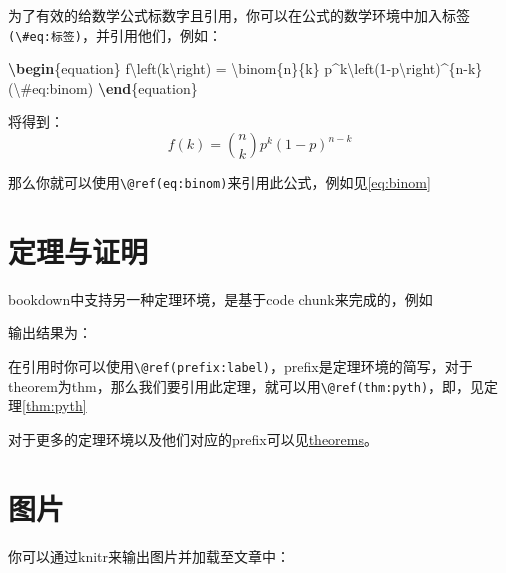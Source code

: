 \documentclass[singlesided]{Style/ucasthesis}%
\newenvironment{Shaded}{\begin{snugshade}}{\end{snugshade}}
\newcommand{\KeywordTok}[1]{\textcolor[rgb]{0.13,0.29,0.53}{\textbf{{#1}}}}
\newcommand{\SpecialCharTok}[1]{\textcolor[rgb]{0.00,0.00,0.00}{{#1}}}
\newcommand{\SpecialStringTok}[1]{\textcolor[rgb]{0.31,0.60,0.02}{{#1}}}
\newcommand{\ExtensionTok}[1]{{#1}}
\newcommand{\NormalTok}[1]{{#1}}
\begin{document}
为了有效的给数学公式标数字且引用，你可以在公式的数学环境中加入标签\texttt{(\textbackslash{}\#eq:标签)}，并引用他们，例如：

\begin{Shaded}
\begin{Highlighting}[]
\KeywordTok{\textbackslash{}begin}\NormalTok{\{}\ExtensionTok{equation}\NormalTok{\}}\SpecialStringTok{ }
\SpecialStringTok{  f}\SpecialCharTok{\textbackslash{}left}\SpecialStringTok{(k}\SpecialCharTok{\textbackslash{}right}\SpecialStringTok{) = }\SpecialCharTok{\textbackslash{}binom}\SpecialStringTok{\{n\}\{k\} p^k}\SpecialCharTok{\textbackslash{}left}\SpecialStringTok{(1-p}\SpecialCharTok{\textbackslash{}right}\SpecialStringTok{)^\{n-k\}}
\SpecialStringTok{  (}\SpecialCharTok{\textbackslash{}#}\SpecialStringTok{eq:binom)}
\KeywordTok{\textbackslash{}end}\NormalTok{\{}\ExtensionTok{equation}\NormalTok{\}}
\end{Highlighting}
\end{Shaded}

将得到：
\begin{equation} 
  f\left(k\right) = \binom{n}{k} p^k\left(1-p\right)^{n-k}
  \label{eq:binom}
\end{equation}

那么你就可以使用\texttt{\textbackslash{}@ref(eq:binom)}来引用此公式，例如见\eqref{eq:binom}

\hypertarget{theorems-proof}{%
\section{定理与证明}\label{theorems-proof}}

bookdown中支持另一种定理环境，是基于code chunk来完成的，例如

输出结果为：

在引用时你可以使用\texttt{\textbackslash{}@ref(prefix:label)}，prefix是定理环境的简写，对于theorem为thm，那么我们要引用此定理，就可以用\texttt{\textbackslash{}@ref(thm:pyth)}，即，见定理\ref{thm:pyth}

对于更多的定理环境以及他们对应的prefix可以见\href{https://bookdown.org/yihui/bookdown/markdown-extensions-by-bookdown.html\#theorems}{theorems}。

\hypertarget{section-3}{%
\section{图片}\label{section-3}}

你可以通过knitr来输出图片并加载至文章中：
\end{document}
